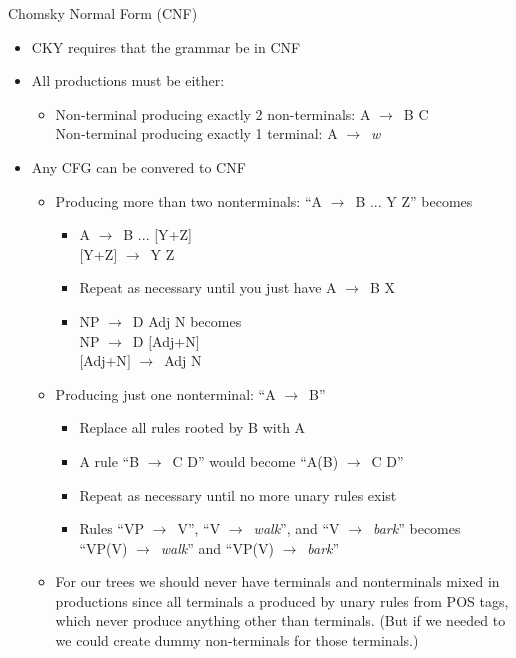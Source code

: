 \documentclass[11pt,letterpaper]{article}
\newcommand{\ra}{\ensuremath{\rightarrow}}
\begin{document}
Chomsky Normal Form (CNF)
\begin{itemize}
  \item CKY requires that the grammar be in CNF
  \item All productions must be either:
	\begin{itemize}
	  \item Non-terminal producing exactly 2 non-terminals: A \ra\ B C\\
	        Non-terminal producing exactly 1 terminal: A \ra\ \textit{w}
	\end{itemize}
  \item Any CFG can be convered to CNF
	\begin{itemize}
	  \item Producing more than two nonterminals: ``A \ra\ B ... Y Z'' becomes
		\begin{itemize}
		  \item A \ra\ B ... [Y+Z] \\ $[$Y+Z$]$ \ra\ Y Z
		  \item Repeat as necessary until you just have  A \ra\ B X
		  \item NP \ra\ D Adj N becomes\\  NP \ra\ D $[$Adj+N$]$ \\ $[$Adj+N$]$ \ra\ Adj N
		\end{itemize}
	  \item Producing just one nonterminal:  ``A \ra\ B''
		\begin{itemize}
		  \item Replace all rules rooted by B with A
		  \item A rule ``B \ra\ C D'' would become ``A(B) \ra\ C D''
		  \item Repeat as necessary until no more unary rules exist
		  \item Rules ``VP \ra\ V'', ``V \ra\ \textit{walk}'', and ``V \ra\ \textit{bark}'' becomes \\ 
		        ``VP(V) \ra\ \textit{walk}'' and ``VP(V) \ra\ \textit{bark}''
		\end{itemize}
	  \item For our trees we should never have terminals and nonterminals mixed in productions since all terminals a produced by unary rules from POS tags, which never produce anything other than terminals. (But if we needed to we could create dummy non-terminals for those terminals.)
	\end{itemize}
\end{itemize}
\end{document}
